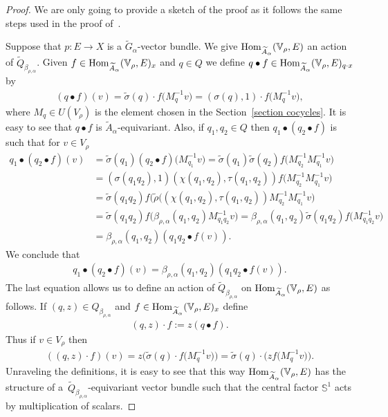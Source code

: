 \documentclass[11pt]{article}
\numberwithin{equation}{section}
\def\S{\mathbb{S}}
\def\V{\mathbb{V}}
\DeclareMathOperator{\Hom}{\textup{Hom}}
\theoremstyle{definition}
\numberwithin{equation}{section}
\begin{document}
\begin{proof} We are only going to provide a sketch of the proof as it follows the same
steps used in the proof of~\cite[Theorem 2.1]{GomezUribe}.

Suppose that $p\colon E \rightarrow X$ is a $\widetilde{G}_{\alpha}$-vector bundle. We give
$\Hom_{\widetilde{A}_{\alpha}}(\V_{\rho},E)$ an action of
	$\widetilde{Q}_{\beta_{\rho,\alpha}}$. Given $f \in
\Hom_{\widetilde{A}_{\alpha}}(\V_{\rho},E)_{x}$ and
$q\in Q$ we define $q \bullet f \in
\Hom_{\widetilde{A}_{\alpha}}(\V_{\rho},E)_{q\cdot x}$ by
\begin{gather*}
(q\bullet f)(v)=\tilde{\sigma}(q)\cdot f\big(M_{q}^{-1}v\big)
=(\sigma(q),1) \cdot f\big(M_{q}^{-1}v\big),
\end{gather*}
where $M_{q} \in U(V_{\rho})$ is the element chosen in the Section~\ref{section cocycles}.
It is easy to see that $q \bullet f$ is $\widetilde{A}_{\alpha}$-equivariant. Also,
if $q_{1}, q_{2}\in Q$ then $q_{1}\bullet
(q_{2} \bullet f)$ is such that for $v \in V_{\rho}$
\begin{align*}
q_{1}\bullet(q_{2}\bullet f)(v)&=\tilde{\sigma}(q_{1})
(q_{2}\bullet f)\big(M_{q_{1}}^{-1}v\big)=\tilde{\sigma}(q_{1})\tilde{\sigma}(q_{2})
f\big(M_{q_{2}}^{-1}M_{q_{1}}^{-1}v\big)\\
&=(\sigma(q_{1}q_{2}),1)(\chi(q_{1},q_{2}),\tau(q_{1},q_{2}))
f\big(M_{q_{2}}^{-1}M_{q_{1}}^{-1}v\big)\\
&=\tilde{\sigma}(q_{1}q_{2})f(\tilde{\rho}\big((\chi(q_{1},q_{2}),\tau(q_{1},q_{2}))
M_{q_{2}}^{-1}M_{q_{1}}^{-1}v\big)
\\
&=\tilde{\sigma}(q_{1}q_{2})
f\big(\beta_{\rho,\alpha}(q_{1},q_{2})M_{q_{1}q_{2}}^{-1}v\big)=\beta_{\rho,\alpha}(q_{1},q_{2}) \tilde{\sigma}(q_{1}q_{2})
f\big(M_{q_{1}q_{2}}^{-1}v\big)\\
&=\beta_{\rho,\alpha}(q_{1},q_{2})(q_{1}q_{2}\bullet f(v)).
\end{align*}
We conclude that
\begin{gather*}
q_{1}\bullet(q_{2}\bullet
f)(v)=\beta_{\rho,\alpha}(q_{1},q_{2})(q_{1}q_{2}\bullet f(v)).
\end{gather*}
The last equation allows us to define an action of
$\widetilde{Q}_{\beta_{\rho,\alpha}}$ on
$\Hom_{\widetilde{A}_{\alpha}}(\V_{\rho},E)$ as follows. If
$(q, z) \in Q_{\beta_{\rho,\alpha}}$ and $f \in
\Hom_{\widetilde{A}_{\alpha}}(\V_{\rho},E)_{x}$ define
\begin{gather*}
(q,z)\cdot f:=z(q\bullet f).
\end{gather*}
Thus if $v\in V_{\rho}$ then
\begin{gather*}
((q,z)\cdot f)(v)=z\big(\tilde{\sigma}(q)\cdot f\big(M_{q}^{-1}v\big)\big)=
\tilde{\sigma}(q)\cdot \big(zf\big(M_{q}^{-1}v\big)\big).
\end{gather*}
Unraveling the definitions, it is easy to see that this way
$\Hom_{\widetilde{A}_{\alpha}}(\V_{\rho},E)$ has the structure of
a~$\widetilde{Q}_{\beta_{\rho,\alpha}}$-equivariant vector bundle such that
the central factor $\S^{1}$ acts by multiplication of scalars.


\end{proof}
\end{document}
